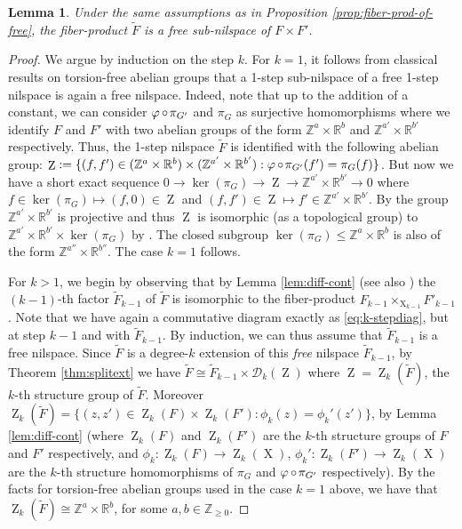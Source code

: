 \documentclass[a4paper,12pt,reqno]{amsart}
\newtheorem{lemma}[theorem]{Lemma}
\theoremstyle{definition}
\def\to{\rightarrow}
\newcommand{\mc}{\mathcal}
\newcommand{\mb}{\mathbb}
\DeclareMathOperator{\ab}{Z}
\DeclareMathOperator{\ns}{X}
\DeclareMathOperator{\co}{\circ\hspace{-0.02 cm}}
\begin{document}
\begin{lemma}\label{lem:fiber-prod-of-free-is-free}
Under the same assumptions as in Proposition \ref{prop:fiber-prod-of-free}, the fiber-product $\tilde{F}$ is a free sub-nilspace of $F\times F'$.    
\end{lemma}
\begin{proof}
    We argue by induction on the step $k$. For $k=1$, it follows from classical results on torsion-free abelian groups that a 1-step sub-nilspace of a free 1-step nilspace is again a free nilspace. Indeed, note that up to the addition of a constant, we can consider $\varphi\co \pi_{G'}$ and $\pi_G$ as surjective homomorphisms where we identify $F$ and $F'$ with two abelian groups of the form $\mb{Z}^a\times \mb{R}^b$ and $\mb{Z}^{a'}\times \mb{R}^{b'}$ respectively. Thus, the 1-step nilspace $\tilde{F}$ is identified with the following abelian group: $\ab:=\{(f,f')\in (\mb{Z}^a\times \mb{R}^b)\times (\mb{Z}^{a'}\times \mb{R}^{b'}):\varphi\co \pi_{G'}(f')=\pi_G(f)\}$. But now we have a short exact sequence $0\to \ker(\pi_G)\to \ab\to \mb{Z}^{a'}\times \mb{R}^{b'}\to 0$ where $f\in \ker(\pi_G)\mapsto (f,0)\in \ab$ and $(f,f')\in \ab\mapsto f'\in \mb{Z}^{a'}\times \mb{R}^{b'}$. By \cite[Theorem 3.3]{Mosk} the group $\mb{Z}^{a'}\times \mb{R}^{b'}$ is projective and thus $\ab$ is isomorphic (as a topological group) to $\mb{Z}^{a'}\times \mb{R}^{b'}\times \ker(\pi_G)$ by \cite[Theorem 3.5]{Mosk}. The closed subgroup $\ker(\pi_G)\leq \mb{Z}^{a}\times \mb{R}^b$ is also of the form $\mb{Z}^{a''}\times \mb{R}^{b''}$. The case $k=1$ follows.

    For $k>1$, we begin by observing that by Lemma \ref{lem:diff-cont} (see also \cite[Proposition A.20]{CGSS-p-hom}) the $(k-1)$-th factor $\tilde{F}_{k-1}$ of $\tilde{F}$ is isomorphic to the fiber-product $F_{k-1}\times_{\ns_{k-1}} F'_{k-1}$. Note that we have again a commutative diagram exactly as \eqref{eq:k-stepdiag}, but at step $k-1$ and with $\tilde{F}_{k-1}$. By induction, we can thus assume that $\tilde{F}_{k-1}$ is a free nilspace. Since $\tilde{F}$ is a degree-$k$ extension of this \emph{free} nilspace $\tilde{F}_{k-1}$, by Theorem \ref{thm:splitext} we have $\tilde{F}\cong \tilde{F}_{k-1}\times \mc{D}_k(\ab)$ where $\ab=\ab_k(\tilde{F})$, the $k$-th structure group of $\tilde{F}$. Moreover $\ab_k(\tilde{F})=\{(z,z')\in \ab_k(F)\times \ab_k(F'): \phi_k(z)=\phi_k'(z')\}$, by Lemma \ref{lem:diff-cont} (where $\ab_k(F)$ and $\ab_k(F')$ are the $k$-th structure groups of $F$ and $F'$ respectively, and $\phi_k:\ab_k(F)\to \ab_k(\ns)$, $\phi_k':\ab_k(F')\to \ab_k(\ns)$ are the $k$-th structure homomorphisms of $\pi_G$ and $\varphi\co \pi_{G'}$ respectively). By the facts for torsion-free abelian groups used in the case $k=1$ above, we have that  $\ab_k(\tilde{F})\cong \mb{Z}^a\times \mb{R}^b$, for some $a,b\in\mb{Z}_{\geq 0}$.
\end{proof}
\end{document}
